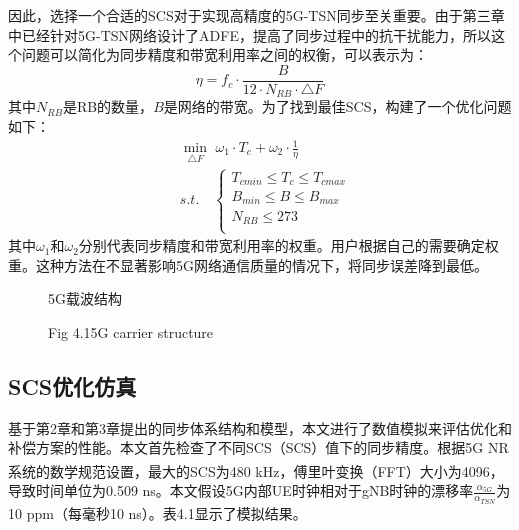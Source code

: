 \documentclass[UTF8,a4paper,12pt]{ctexart}
\numberwithin{equation}{section}
\begin{document}
	因此，选择一个合适的SCS对于实现高精度的5G-TSN同步至关重要。由于第三章中已经针对5G-TSN网络设计了ADFE，提高了同步过程中的抗干扰能力，所以这个问题可以简化为同步精度和带宽利用率之间的权衡，可以表示为：
	\begin{equation}
		\eta=f_c\cdot \frac{B}{12\cdot N_{RB}\cdot \triangle F}
	\end{equation}
	其中$N_{RB}$是RB的数量，$B$是网络的带宽。为了找到最佳SCS，构建了一个优化问题如下：
	\begin{equation}
		\begin{split}
			&\min_{\triangle F} \,\, \omega_1 \cdot T_c+\omega_2 \cdot \frac{1}{\eta} \\
			&s.t.\quad  \left\{\begin{array}{lc}
				T_{cmin}\leq T_c \leq T_{cmax}\\
				B_{min}\leq B \leq B_{max}\\
				N_{RB}\leq 273\\
			\end{array}\right.
		\end{split}
	\end{equation}
	其中$\omega_1$和$\omega_2$分别代表同步精度和带宽利用率的权重。用户根据自己的需要确定权重。这种方法在不显著影响5G网络通信质量的情况下，将同步误差降到最低。
	\begin{figure}[htb] 
		\caption{5G载波结构}
		\vspace{-10pt}
		\caption*{Fig 4.1\quad 5G carrier structure}
	\end{figure}
	
	\subsection{SCS优化仿真}
	基于第2章和第3章提出的同步体系结构和模型，本文进行了数值模拟来评估优化和补偿方案的性能。本文首先检查了不同SCS（SCS）值下的同步精度。根据5G NR系统的数学规范设置\textsuperscript{\cite{access2015requirements}}，最大的SCS为480 kHz，傅里叶变换（FFT）大小为4096，导致时间单位为0.509 ns。本文假设5G内部UE时钟相对于gNB时钟的漂移率$\frac{\alpha_{5G}}{\alpha_{TSN}}$为10 ppm（每毫秒10 ns）。表4.1显示了模拟结果。
	
\end{document}
